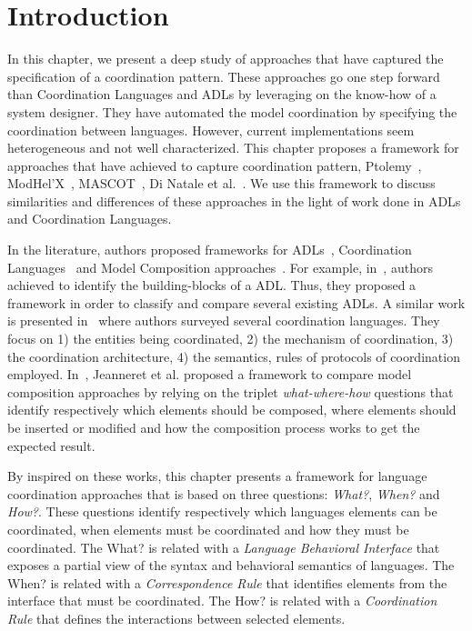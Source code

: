 \section{Introduction}
In this chapter, we present a deep study of approaches that have captured the specification of a coordination pattern. These approaches go one step forward than Coordination Languages and ADLs by leveraging on the know-how of a system designer. They have automated the model coordination by specifying the coordination between languages. However, current implementations seem heterogeneous and not well characterized. This chapter proposes a framework for approaches that have achieved to capture coordination pattern, \ie Ptolemy~\cite{ptoleframebib}, ModHel'X~\cite{modhelxbib}, MASCOT~\cite{mascotbib}, Di Natale et al.~\cite{dinatale}. We use this framework to discuss similarities and differences of these approaches in the light of work done in ADLs and Coordination Languages. 

In the literature, authors proposed frameworks for ADLs~\cite{frameadlsbib}, Coordination Languages~\cite{coordmodels} and Model Composition approaches~\cite{framecompoas}. For example, in~\cite{frameadlsbib}, authors achieved to identify the building-blocks of a ADL. Thus, they proposed a framework in order to classify and compare several existing ADLs. A similar work is presented in~\cite{coordmodels} where authors surveyed several coordination languages. They focus on 1) the entities being coordinated, 2) the mechanism of
coordination, 3) the coordination architecture, 4) the semantics, rules of protocols of coordination employed. In~\cite{framecompoas}, Jeanneret et al. proposed a framework to compare model
composition approaches by relying on the triplet \emph{what-where-how} questions that identify respectively which elements should be composed, where elements should be inserted or modified and how the composition process works to get the expected result. 

By inspired on these works, this chapter presents a framework for language coordination approaches that is based on three questions: \emph{What?}, \emph{When?} and \emph{How?}. These questions identify respectively which languages elements can be coordinated, when elements must be coordinated and how they must be coordinated. The What? is related with a \emph{Language Behavioral Interface} that exposes a partial view of the syntax and behavioral semantics of languages. The When? is related with a \emph{Correspondence Rule} that identifies elements from the interface that must be coordinated. The How? is related with a \emph{Coordination Rule} that defines the interactions between selected elements. 


